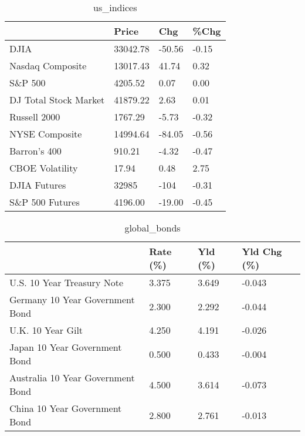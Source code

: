 \documentclass{article}%
\begin{document}
%


\begin{table}[htbp]%
\caption{us\_indices}%
\centering%
\begin{adjustbox}{width=1\textwidth}%
\begin{tabular}{llll}
\toprule
                      &    Price &    Chg &  \%Chg \\
\midrule
                 DJIA & 33042.78 & -50.56 & -0.15 \\
     Nasdaq Composite & 13017.43 &  41.74 &  0.32 \\
              S\&P 500 &  4205.52 &   0.07 &  0.00 \\
DJ Total Stock Market & 41879.22 &   2.63 &  0.01 \\
         Russell 2000 &  1767.29 &  -5.73 & -0.32 \\
       NYSE Composite & 14994.64 & -84.05 & -0.56 \\
         Barron's 400 &   910.21 &  -4.32 & -0.47 \\
      CBOE Volatility &    17.94 &   0.48 &  2.75 \\
         DJIA Futures &    32985 &   -104 & -0.31 \\
      S\&P 500 Futures &  4196.00 & -19.00 & -0.45 \\
\bottomrule
\end{tabular}
%
\end{adjustbox}%
\end{table}

%


\begin{table}[htbp]%
\caption{global\_bonds}%
\centering%
\begin{adjustbox}{width=1\textwidth}%
\begin{tabular}{llll}
\toprule
                                  & Rate (\%) & Yld (\%) & Yld Chg (\%) \\
\midrule
       U.S. 10 Year Treasury Note &    3.375 &   3.649 &      -0.043 \\
  Germany 10 Year Government Bond &    2.300 &   2.292 &      -0.044 \\
                U.K. 10 Year Gilt &    4.250 &   4.191 &      -0.026 \\
    Japan 10 Year Government Bond &    0.500 &   0.433 &      -0.004 \\
Australia 10 Year Government Bond &    4.500 &   3.614 &      -0.073 \\
    China 10 Year Government Bond &    2.800 &   2.761 &      -0.013 \\
\bottomrule
\end{tabular}
%
\end{adjustbox}%
\end{table}
\end{document}

